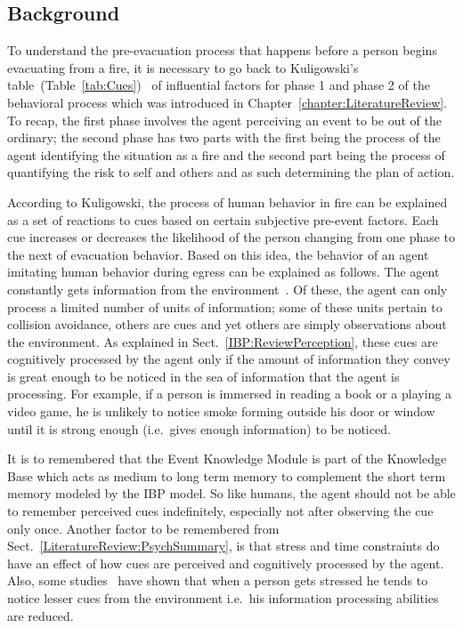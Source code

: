 \subsection{Background}
\label{CFW:EKMBackground}
To understand the pre-evacuation process that happens before a person begins evacuating from a fire, it is necessary to go back to Kuligowski's table~(Table~\ref{tab:Cues})~\cite{Kuligowski:2009un} of influential factors for phase 1 and phase 2 of the behavioral process which was introduced in Chapter~\ref{chapter:LiteratureReview}. To recap, the first phase involves the agent perceiving an event to be out of the ordinary; the second phase has two parts with the first being the process of the agent identifying the situation as a fire and the second part being the process of quantifying the risk to self and others and as such determining the plan of action.

According to Kuligowski, the process of human behavior in fire can be explained as a set of reactions to cues based on certain subjective pre-event factors. Each cue increases or decreases the likelihood of the person changing from one phase to the next of evacuation behavior. Based on this idea, the behavior of an agent imitating human behavior during egress can be explained as follows. The agent constantly gets information from the environment~\cite{Simon:1970th}. Of these, the agent can only process a limited number of units of information; some of these units pertain to collision avoidance, others are cues and yet others are simply observations about the environment. As explained in Sect.~\ref{IBP:ReviewPerception}, these cues are cognitively processed by the agent only if the amount of information they convey is great enough to be noticed in the sea of information that the agent is processing. For example, if a person is immersed in reading a book or a playing a video game, he is unlikely to notice smoke forming outside his door or window until it is strong enough (i.e.\ gives enough information) to be noticed.

It is to remembered that the Event Knowledge Module is part of the Knowledge Base which acts as medium to long term memory to complement the short term memory modeled by the IBP model. So like humans, the agent should not be able to remember perceived cues indefinitely, especially not after observing the cue only once. Another factor to be remembered from Sect.~\ref{LiteratureReview:PsychSummary}, is that stress and time constraints do have an effect of how cues are perceived and cognitively processed by the agent. Also, some studies~\cite{Ozel:2001tn} have shown that when a person gets stressed he tends to notice lesser cues from the environment i.e.\ his information processing abilities are reduced. 

